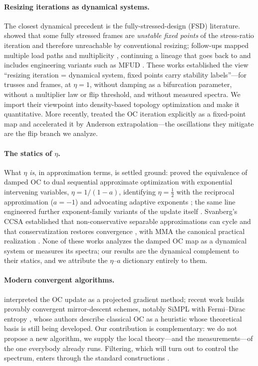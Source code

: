 \documentclass[11pt,a4paper]{article}
\begin{document}
\paragraph{Resizing iterations as dynamical systems.} The closest
dynamical precedent is the fully-stressed-design (FSD) literature.
\citet{mueller2001} showed that some fully stressed frames are
\emph{unstable fixed points} of the stress-ratio iteration and therefore
unreachable by conventional resizing; follow-ups mapped multiple load
paths and multiplicity \citep{mueller2002,liu2003}, continuing a lineage
that goes back to \citet{razani1965} and includes engineering variants
such as MFUD \citep{patnaik1998mfud}. These works established the view
``resizing iteration = dynamical system, fixed points carry stability
labels''---for trusses and frames, at $\eta=1$, without damping as a
bifurcation parameter, without a multiplier law or flip threshold, and
without measured spectra. We import their viewpoint into density-based
topology optimization and make it quantitative. More recently,
\citet{li2020fixedpoint} treated the OC iteration explicitly as a
fixed-point map and accelerated it by Anderson extrapolation---the
oscillations they mitigate are the flip branch we analyze.

\paragraph{The statics of $\eta$.} What $\eta$ \emph{is}, in approximation
terms, is settled ground: \citet{groenwold2008} proved the equivalence of
damped OC to dual sequential approximate optimization with exponential
intervening variables, $\eta=1/(1-a)$, identifying $\eta=\tfrac12$ with the
reciprocal approximation ($a=-1$) and advocating adaptive exponents
\citep[see also][]{groenwold2007ise}; the same line engineered further
exponent-family variants of the update itself
\citep{groenwold2009gss}. Svanberg's CCSA established that
non-conservative separable approximations can cycle and that
conservatization restores convergence \citep{svanberg2002ccsa}, with MMA
the canonical practical realization \citep{svanberg1987mma}. None of these
works analyzes the damped OC map as a dynamical system or measures its
spectra; our results are the dynamical complement to their statics, and we
attribute the $\eta$--$a$ dictionary entirely to them.

\paragraph{Modern convergent algorithms.} \citet{ananiev2005} interpreted
the OC update as a projected gradient method; recent work builds provably
convergent mirror-descent schemes, notably SiMPL with Fermi--Dirac
entropy \citep{kim2025simpl,keith2024simpl}, whose authors describe
classical OC as a heuristic whose theoretical basis is still being
developed. Our contribution is complementary: we do not propose a new
algorithm, we supply the local theory---and the measurements---of the one
everybody already runs. Filtering, which will turn out to control the
spectrum, enters through the standard constructions
\citep{sigmund1998numerical,bourdin2001}.
\end{document}
